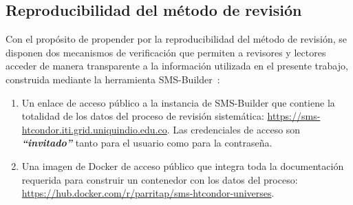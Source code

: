 
\subsection{Reproducibilidad del método de revisión}

Con el propósito de propender por la reproducibilidad del método de revisión, se disponen dos mecanismos de verificación que permiten a revisores y lectores acceder de manera transparente a la información utilizada en el presente trabajo, construida mediante la herramienta SMS-Builder~\cite{sms-builder-repo}: \\

\begin{enumerate}[label=\Roman*)]
	\item Un enlace de acceso público a la instancia de SMS-Builder que contiene la totalidad de los datos del proceso de revisión sistemática: \url{https://sms-htcondor.iti.grid.uniquindio.edu.co}. Las credenciales de acceso son \hbox{\textbf{\textit{``invitado''}}} tanto para el usuario como para la contraseña.
	\item Una imagen de Docker de acceso público que integra toda la documentación requerida para construir un contenedor con los datos del proceso: \url{https://hub.docker.com/r/parritap/sms-htcondor-universes}.
\end{enumerate}




